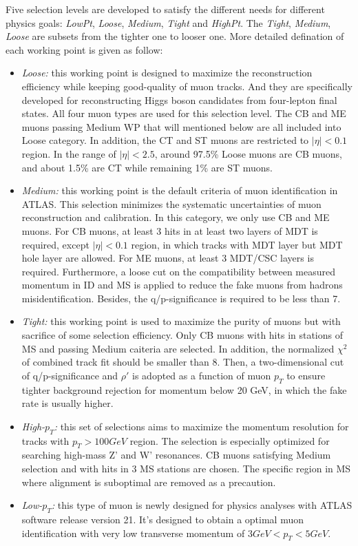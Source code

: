 Five selection levels are developed to satisfy the different needs for different physics goals: \textit{LowPt}, \textit{Loose}, \textit{Medium}, \textit{Tight} and \textit{HighPt}.
The \textit{Tight}, \textit{Medium}, \textit{Loose} are subsets from the tighter one to looser one.
More detailed defination of each working point is given as follow:
\begin{itemize}
	\item \textit{Loose:} this working point is designed to maximize the reconstruction efficiency while keeping good-quality of muon tracks. And they are specifically developed for reconstructing Higgs boson candidates from four-lepton final states. All four muon types are used for this selection level. The CB and ME muons passing Medium WP that will mentioned below are all included into Loose category. In addition, the CT and ST muons are restricted to $|\eta| < 0.1$ region.
In the range of $|\eta| < 2.5$, around 97.5\% Loose muons are CB muons, and about 1.5\% are CT while remaining 1\% are ST muons.
	\item \textit{Medium:} this working point is the default criteria of muon identification in ATLAS. This selection minimizes the systematic uncertainties of muon reconstruction and calibration. In this category, we only use CB and ME muons. For CB muons, at least 3 hits in at least two layers of MDT is required, except $|\eta| < 0.1$ region, in which tracks with  MDT layer but  MDT hole layer are allowed. For ME muons, at least 3 MDT/CSC layers is required.
Furthermore, a loose cut on the compatibility between measured momentum in ID and MS is applied to reduce the fake muons from hadrons misidentification. Besides, the q/p-significance is required to be less than 7.
	\item \textit{Tight:} this working point is used to maximize the purity of muons but with sacrifice of some selection efficiency. Only CB muons with hits in  stations of MS and passing Medium caiteria are selected.
In addition, the normalized $\chi^{2}$ of combined track fit should be smaller than 8. Then, a two-dimensional cut of q/p-significance and $\rho'$ is adopted as a function of muon $p_{T}$ to ensure tighter background rejection for momentum below 20 GeV, in which the fake rate is usually higher.
	\item \textit{High-$p_{T}$:} this set of selections aims to maximize the momentum resolution for tracks with $p_{T} > 100 GeV$ region. The selection is especially optimized for searching high-mass Z' and W' resonances. CB muons satisfying Medium selection and with  hits in 3 MS stations are chosen. The specific region in MS where alignment is suboptimal are removed as a precaution.
	\item \textit{Low-$p_{T}$:} this type of muon is newly designed for physics analyses with ATLAS software release version 21. It's designed to obtain a optimal muon identification with very low transverse momentum of $3 GeV < p_{T} < 5 GeV$.
\end{itemize}

